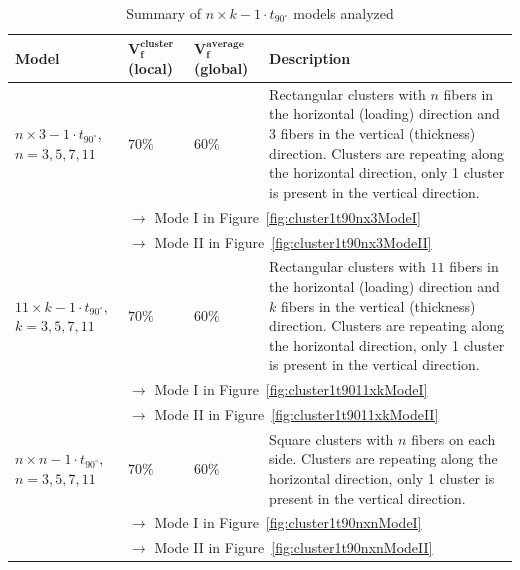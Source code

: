 \documentclass[review]{elsarticle}
\begin{document}
\begin{table}[!h]
\caption{Summary of $n\times k-1\cdot t_{90^{\circ}}$ models analyzed}\label{table:crossply}
\begin{tabularx}{\textwidth}{p{}XXp{}}
\bf{Model}&$\mathbf{V_{f}^{cluster}}$ \bf{(local)}&$\mathbf{V_{f}^{average}}$ \bf{(global)}&\bf{Description}\\
\midrule
\toprule
$n\times 3-1\cdot t_{90^{\circ}}$, $n=3,5,7,11$&$70\%$&$60\%$&Rectangular clusters with $n$ fibers in the horizontal (loading) direction and $3$ fibers in the vertical (thickness) direction. Clusters are repeating along the horizontal direction, only 1 cluster is present in the vertical direction.\\
&\multicolumn{3}{l}{$\rightarrow$ Mode I in Figure~\ref{fig:cluster1t90nx3ModeI}}\\
&\multicolumn{3}{l}{$\rightarrow$ Mode II in Figure~\ref{fig:cluster1t90nx3ModeII}}\\
\midrule
$11\times k-1\cdot t_{90^{\circ}}$, $k=3,5,7,11$&$70\%$&$60\%$&Rectangular clusters with $11$ fibers in the horizontal (loading) direction and $k$ fibers in the vertical (thickness) direction. Clusters are repeating along the horizontal direction, only 1 cluster is present in the vertical direction.\\
&\multicolumn{3}{l}{$\rightarrow$ Mode I in Figure~\ref{fig:cluster1t9011xkModeI}}\\
&\multicolumn{3}{l}{$\rightarrow$ Mode II in Figure~\ref{fig:cluster1t9011xkModeII}}\\
\midrule
$n\times n-1\cdot t_{90^{\circ}}$, $n=3,5,7,11$&$70\%$&$60\%$&Square clusters with $n$ fibers on each side. Clusters are repeating along the horizontal direction, only 1 cluster is present in the vertical direction.\\
&\multicolumn{3}{l}{$\rightarrow$ Mode I in Figure~\ref{fig:cluster1t90nxnModeI}}\\
&\multicolumn{3}{l}{$\rightarrow$ Mode II in Figure~\ref{fig:cluster1t90nxnModeII}}\\
\midrule
\end{tabularx}
\end{table}
\end{document}
